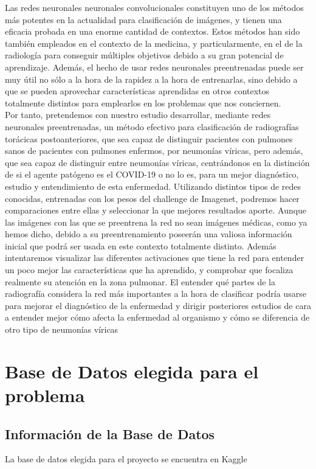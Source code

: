\documentclass[11pt,a4paper]{article}
\theoremstyle{definition}
\begin{document}
Las redes neuronales neuronales convolucionales constituyen uno de los métodos más potentes en la actualidad para clasificación de imágenes,  y tienen una eficacia probada en una enorme cantidad de contextos.  Estos métodos han sido también empleados en el contexto de la medicina, y particularmente, en el de la radiología para conseguir múltiples objetivos debido a su gran potencial de aprendizaje. \cite{problemas1, problemas2} Además, el hecho de usar redes neuronales preentrenadas puede ser muy útil no sólo a la hora de la rapidez a la hora de entrenarlas, sino debido a que se pueden aprovechar características aprendidas en otros contextos totalmente distintos para emplearlos en los problemas que nos conciernen.\\

Por tanto,  pretendemos con nuestro estudio desarrollar, mediante redes neuronales preentrenadas, un método efectivo para clasificación de radiografías torácicas postoanteriores, que sea capaz de distinguir pacientes con pulmones sanos de pacientes con pulmones enfermos, por neumonías víricas, pero además, que sea capaz de distinguir entre neumonías víricas, centrándonos en la distinción de si el agente patógeno es el COVID-19 o no lo es, para un mejor diagnóstico, estudio y entendimiento de esta enfermedad.  Utilizando distintos tipos de redes conocidas, entrenadas con los pesos del challenge de  Imagenet, podremos hacer comparaciones entre ellas y seleccionar la que mejores resultados aporte.  Aunque las imágenes con las que se preentrena la red no sean imágenes médicas, como ya hemos dicho, debido a su preentrenamiento poseerán una valiosa información inicial que podrá ser usada en este contexto totalmente distinto. Además intentaremos visualizar las diferentes activaciones que tiene la red para entender un poco mejor las características que ha aprendido, y comprobar que focaliza realmente su atención en la zona pulmonar.  El entender qué partes de la radiografía considera la red más importantes a la hora de clasificar podría usarse para mejorar el diagnóstico de la enfermedad y dirigir posteriores estudios de cara a entender mejor cómo afecta la enfermedad al organismo y cómo se diferencia de otro tipo de neumonías víricas \\

\section{Base de Datos elegida para el problema}
\subsection{Información de la Base de Datos}
La base de datos elegida para el proyecto se encuentra en Kaggle \cite{kaggle}\\
\end{document}
